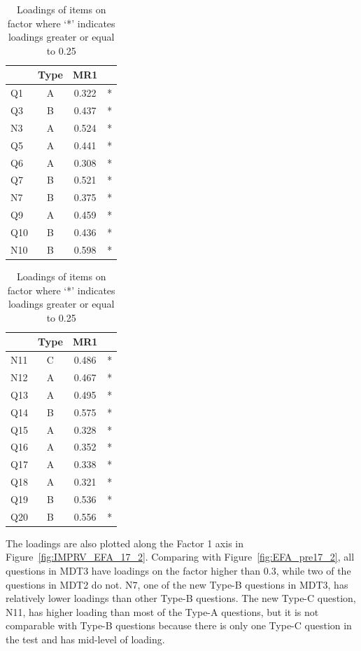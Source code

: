 \documentclass[a4paper]{report}
\begin{document}
\begin{table}[ht]
  \begin{minipage}{0.5\linewidth}
    \centering
    \begin{tabular}{lccc}
      \hline
     & Type & MR1 & \\ 
      \hline
    Q1 & A & 0.322 & * \\ 
      Q3 & B & 0.437 & * \\ 
      N3 & A & 0.524 & * \\ 
      Q5 & A & 0.441 & * \\ 
      Q6 & A & 0.308 & * \\ 
      Q7 & B & 0.521 & * \\ 
      N7 & B & 0.375 & * \\ 
      Q9 & A & 0.459 & * \\ 
      Q10 & B & 0.436 & * \\ 
      N10 & B & 0.598 & * \\ 
       \hline
    \end{tabular}
  \end{minipage}%
  \begin{minipage}{0.5\linewidth}
    \centering
    \begin{tabular}{lccc}
      \hline
     & Type & MR1 & \\ 
      \hline
    N11 & C & 0.486 & * \\ 
      N12 & A & 0.467 & * \\ 
      Q13 & A & 0.495 & * \\ 
      Q14 & B & 0.575 & * \\ 
      Q15 & A & 0.328 & * \\ 
      Q16 & A & 0.352 & * \\ 
      Q17 & A & 0.338 & * \\ 
      Q18 & A & 0.321 & * \\ 
      Q19 & B & 0.536 & * \\ 
      Q20 & B & 0.556 & * \\ 
       \hline
    \end{tabular}
  \end{minipage}
  \caption{\label{tab:IMPRV_EFA_17_1}Loadings of items on factor where `*' indicates loadings greater or equal to 0.25}
\end{table}

The loadings are also plotted along the Factor 1 axis in Figure~\ref{fig:IMPRV_EFA_17_2}. Comparing with Figure~\ref{fig:EFA_pre17_2}, all questions in MDT3 have loadings on the factor higher than 0.3, while two of the questions in MDT2 do not. N7, one of the new Type-B questions in MDT3, has relatively lower loadings than other Type-B questions. The new Type-C question, N11, has higher loading than most of the Type-A questions, but it is not comparable with Type-B questions because there is only one Type-C question in the test and has mid-level of loading. 
\end{document}
